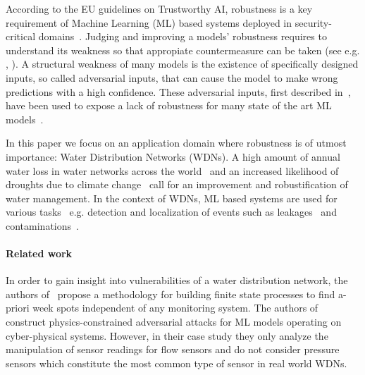 According to the EU guidelines on Trustworthy AI, robustness is a key
requirement of Machine Learning (ML) based systems deployed in security-critical domains~\cite{trustworthy_ai}.  Judging and improving a models' robustness requires to understand its weakness so that appropiate countermeasure can be taken (see e.g. \cite{adversarial_training1}, \cite{adversarial_training2}). 
A structural weakness of many models is the existence of specifically designed inputs, so called adversarial inputs, that can cause the model to make wrong predictions with a high confidence. These adversarial inputs, first
described in~\cite{basic_adversarials}, have been used
to expose a lack of robustness for many state of the art ML models~\cite{printed_adversarials_and_bim,adversarial_tortoise,adversarial_tshirt}.

In this paper we focus on an application domain where robustness is of utmost importance: Water Distribution Networks
(WDNs).  A high amount of annual water loss in water networks across the
world~\cite{global_nrw} and an increased likelihood of droughts due to climate
change~\cite{droughts} call for an improvement and robustification of water
management. In the context of WDNs, ML based systems are used for various tasks~\cite{valerie}
e.g. detection and localization of events such as leakages~\cite{batadal,battledim} and contaminations~\cite{zhu2022review}.
\paragraph*{Related work}
In order to gain insight into vulnerabilities of a water
distribution network, the authors of~\cite{vulnerabilities_fsp} propose a methodology for building finite
state processes to find a-priori week spots independent of any monitoring system. 
The authors of~\cite{conaml} construct physics-constrained adversarial attacks for ML models operating on
cyber-physical systems. However, in their case study they only analyze the
manipulation of sensor readings for flow sensors and do not consider pressure sensors which constitute the most common type of sensor in real world WDNs.

